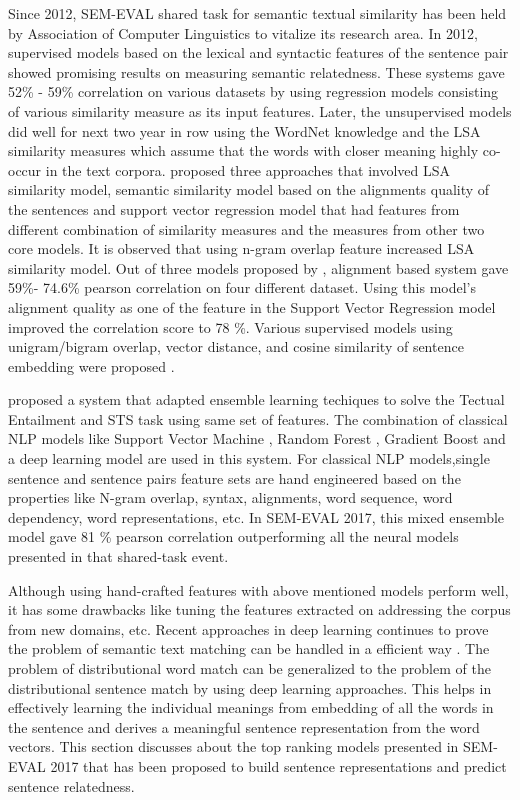 \documentclass[12pt]{article} %
\begin{document}
Since 2012, SEM-EVAL shared task for semantic textual similarity has been held by Association of Computer Linguistics to vitalize its research area. In 2012, supervised models based on the lexical and syntactic features of the sentence pair showed promising results on measuring semantic relatedness. These systems gave 52\% - 59\% correlation on various datasets by using regression models consisting of various similarity measure as its input features. Later, the unsupervised models did well for next two year in row using the WordNet knowledge and the LSA similarity measures which assume that the words with closer meaning highly co-occur in the text corpora. \cite{han2013umbc_ebiquity} proposed three approaches that involved LSA similarity model, semantic similarity model based on the alignments quality of the sentences and support vector regression model that had features from different combination of similarity measures and the measures from other two core models. It is observed that using n-gram overlap feature increased LSA similarity model. Out of three models proposed by \cite{han2013umbc_ebiquity}, alignment based system gave 59\%- 74.6\% pearson correlation on four different dataset. Using this model's alignment quality as one of the feature in the Support Vector Regression model improved the correlation score to 78 \%.  Various supervised models using unigram/bigram overlap, vector distance, and cosine similarity of sentence embedding were proposed \citep{agirre2015semeval}.
 
 \cite{tian2017ecnu} proposed a system that adapted ensemble learning techiques to solve the Tectual Entailment and STS task using same set of features. The combination of classical NLP models like Support Vector Machine , Random Forest , Gradient Boost and a deep learning model are used in this system. For classical NLP models,single sentence and sentence pairs feature sets are hand engineered based on the properties like N-gram overlap, syntax, alignments, word sequence, word dependency, word representations, etc. In SEM-EVAL 2017, this mixed ensemble model gave 81 \% pearson correlation outperforming all the neural models presented in that shared-task event.

Although using hand-crafted features with above mentioned models perform well, it has some drawbacks like tuning the features extracted on addressing the corpus from new domains, etc. Recent approaches in deep learning continues to prove the problem of semantic text matching can be  handled in a efficient way \cite{cer2017semeval}. The problem of distributional word match can be generalized to the problem of the distributional sentence match by using deep learning approaches. This helps in effectively learning the individual meanings from embedding of all the words in the sentence and derives a meaningful sentence representation from the word vectors. This section discusses about the  top ranking models presented in SEM-EVAL 2017 that has been proposed to build sentence representations and predict sentence relatedness. 
\end{document}
